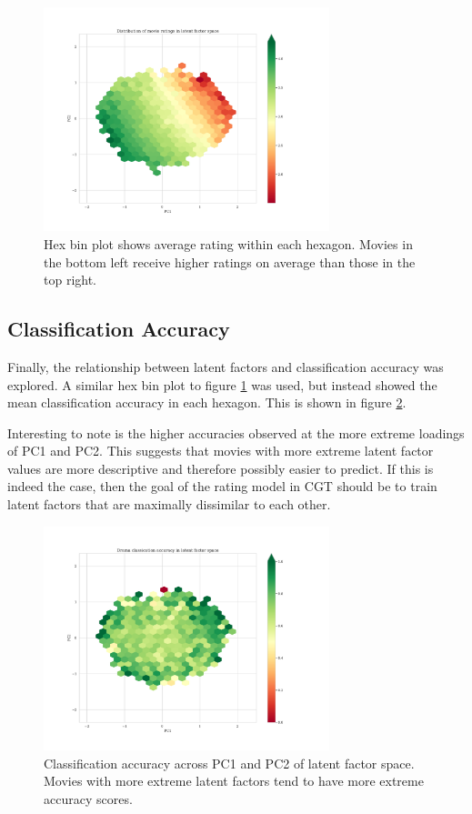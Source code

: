 \begin{figure}[H]
\centering
\includegraphics[width=0.74\textwidth]{Figures/5_ml10m-ratings-hexbin.pdf}
\decoRule
\caption[Average rating hex bin plot in PC1 and 2]{Hex bin plot shows average rating within each hexagon. Movies in the bottom left receive higher ratings on average than those in the top right.}
\label{fig:5-ratings-hexbin}
\end{figure}

\subsection{Classification Accuracy}
Finally, the relationship between latent factors and classification accuracy was explored. A similar hex bin plot to figure \ref{fig:5-ratings-hexbin} was used, but instead showed the mean classification accuracy in each hexagon. This is shown in figure \ref{fig:5-accuracy-hexbin}.

Interesting to note is the higher accuracies observed at the more extreme loadings of PC1 and PC2. This suggests that movies with more extreme latent factor values are more descriptive and therefore possibly easier to predict. If this is indeed the case, then the goal of the rating model in CGT should be to train latent factors that are maximally dissimilar to each other.

\begin{figure}[H]
\centering
\includegraphics[width=0.74\textwidth]{Figures/5_ml10m-accuracy-hexbin.pdf}
\decoRule
\caption[Classification accuracy hex bin plot in PC1 and 2]{Classification accuracy across PC1 and PC2 of latent factor space. Movies with more extreme latent factors tend to have more extreme accuracy scores.}
\label{fig:5-accuracy-hexbin}
\end{figure}